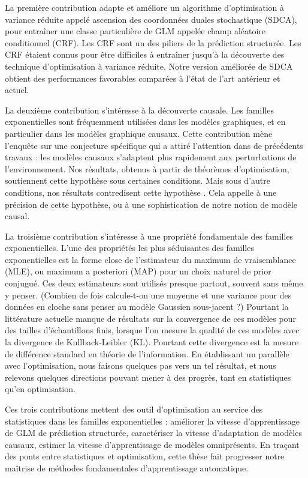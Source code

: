 \documentclass[12pt]{report} %
\numberwithin{equation}{chapter}
\numberwithin{table}{chapter}
\numberwithin{figure}{chapter}
\begin{document}
La première contribution adapte et améliore un algorithme d'optimisation à variance réduite appelé ascension des coordonnées duales stochastique (SDCA), pour entraîner une classe particulière de GLM appelée champ aléatoire conditionnel (CRF). Les CRF sont un des piliers de la prédiction structurée. Les CRF étaient connus pour être difficiles à entraîner jusqu'à la découverte des technique d'optimisation à variance réduite. Notre version améliorée de SDCA  obtient des performances favorables comparées à l'état de l'art antérieur et actuel. 

La deuxième contribution s'intéresse à la découverte causale. 
Les familles exponentielles sont fréquemment utilisées dans les modèles graphiques, et en particulier dans les modèles graphique causaux. 
Cette contribution mène l'enquête sur une conjecture spécifique qui a attiré l'attention dans de précédents travaux : les modèles causaux s'adaptent plus rapidement aux perturbations de l'environnement. 
Nos résultats, obtenus à partir de théorèmes d'optimisation, soutiennent cette hypothèse sous certaines conditions. Mais sous d'autre conditions, nos résultats contredisent cette hypothèse . Cela appelle à une précision de cette hypothèse, ou à une sophistication de notre notion de modèle causal.

La troisième contribution s'intéresse à une propriété fondamentale des familles exponentielles. 
L'une des propriétés les plus séduisantes des familles exponentielles est la forme close de l'estimateur du maximum de vraisemblance (MLE), ou maximum a posteriori (MAP) pour un choix naturel de prior conjugué. 
Ces deux estimateurs sont utilisés presque partout, souvent sans même y penser. 
(Combien de fois calcule-t-on une moyenne et une variance pour des données en cloche sans penser au modèle Gaussien sous-jacent ?)
Pourtant la littérature actuelle manque de résultats sur la convergence de ces modèles pour des tailles d'échantillons finis, lorsque l'on mesure la qualité de ces modèles avec la divergence  de Kullback-Leibler (KL). 
Pourtant cette divergence est la mesure de différence standard en théorie de l'information.
En établissant un parallèle avec l'optimisation, nous faisons quelques pas vers un tel résultat, et nous relevons quelques directions pouvant mener à des progrès, tant en statistiques qu'en optimisation.

Ces trois contributions mettent des outil d'optimisation au service des statistiques dans les familles exponentielles : améliorer la vitesse d'apprentissage de GLM de prédiction structurée, caractériser la vitesse d'adaptation de modèles causaux, estimer la vitesse d'apprentissage de modèles omniprésents. 
En traçant des ponts entre statistiques et optimisation, cette thèse fait progresser notre maîtrise de méthodes fondamentales d'apprentissage automatique.
\end{document}
